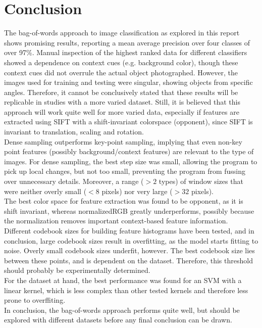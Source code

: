 \documentclass{article} %
\begin{document}
\section{Conclusion}
The bag-of-words approach to image classification as explored in this report shows promising results, reporting a mean average precision over four classes of over 97\%. Manual inspection of the highest ranked data for different classifiers showed a dependence on context cues (e.g. background color), though these context cues did not overrule the actual object photographed. However, the images used for training and testing were singular, showing objects from specific angles. Therefore, it cannot be conclusively stated that these results will be replicable in studies with a more varied dataset. Still, it is believed that this approach will work quite well for more varied data, especially if features are extracted using SIFT with a shift-invariant colorspace (opponent), since SIFT is invariant to translation, scaling and rotation. \\
Dense sampling outperforms key-point sampling, implying that even non-key point features (possibly background/context features) are relevant to the type of images. For dense sampling, the best step size was small, allowing the program to pick up local changes, but not too small, preventing the program from fussing over unnecessary details. Moreover, a range ($>2$ types) of window sizes that were neither overly small ($<$8 pixels) nor very large ($>32$ pixels). \\
The best color space for feature extraction was found to be opponent, as it is shift invariant, whereas normalizedRGB greatly underperforms, possibly because the normalization removes important context-based feature information. \\
Different codebook sizes for building feature histograms have been tested, and in conclusion, large codebook sizes result in overfitting, as the model starts fitting to noise. Overly small codebook sizes underfit, however. The best codebook size lies between these points, and is dependent on the dataset. Therefore, this threshold should probably be experimentally determined. \\
For the dataset at hand, the best performance was found for an SVM with a linear kernel, which is less complex than other tested kernels and therefore less prone to overffiting. \\
In conclusion, the bag-of-words approach performs quite well, but should be explored with different datasets before any final conclusion can be drawn.
\end{document}
